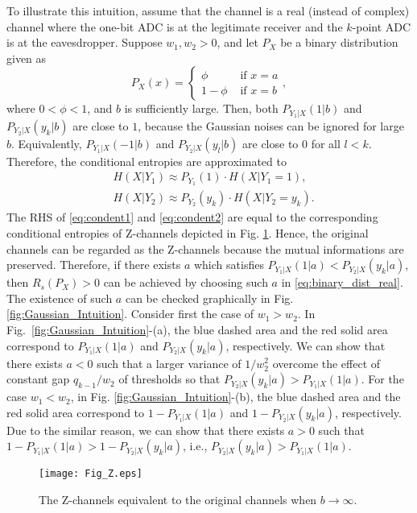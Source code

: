 \documentclass[journal]{IEEEtran}
\begin{document}
To illustrate this intuition, assume that the channel is a real (instead of complex) channel where the one-bit ADC is at the legitimate receiver and the $k$-point ADC is at the eavesdropper. Suppose $w_1,w_2>0$, and let $P_X$ be a binary distribution given as 
\begin{equation}
    P_X(x) = \begin{cases} \phi & \text{ if } x=a \\ 1-\phi & \text{ if } x=b \end{cases}, \label{eq:binary_dist_real}
\end{equation}
where $0<\phi<1$, and $b$ is sufficiently large.
Then, both $P_{Y_1|X}(1|b)$ and $P_{Y_2|X}(y_k|b)$ are close to $1$, because the Gaussian noises can be ignored for large $b$.
Equivalently, $P_{Y_1|X}(-1|b)$ and $P_{Y_2|X}(y_l|b)$ are close to $0$ for all $l<k$.
Therefore, the conditional entropies are approximated to 
\begin{align}
    & H(X|Y_1) \approx P_{Y_1}(1)\cdot H(X|Y_1=1), \label{eq:condent1}
    \\& H(X|Y_2) \approx P_{Y_2}(y_k)\cdot H(X|Y_2=y_k). \label{eq:condent2}
\end{align}
The RHS of \eqref{eq:condent1} and \eqref{eq:condent2} are equal to the corresponding conditional entropies of Z-channels depicted in Fig. \ref{fig:zchannel}. Hence, the original channels can be regarded as the Z-channels because the mutual informations are preserved. Therefore, if there exists $a$ which satisfies $P_{Y_1|X}(1|a) < P_{Y_2|X}(y_k|a)$, then $R_s(P_X)>0$ can be achieved by choosing such $a$ in \eqref{eq:binary_dist_real}. 
The existence of such $a$ can be checked graphically in Fig. \ref{fig:Gaussian_Intuition}. 
Consider first the case of $w_1>w_2$. In \mbox{Fig. \ref{fig:Gaussian_Intuition}-(a)}, the blue dashed area and the red solid area correspond to $P_{Y_1|X}(1|a)$ and $P_{Y_2|X}(y_k|a)$, respectively. We can show that there exists $a<0$ such that a larger variance of $1/w_2^2$ overcome the effect of constant gap $q_{k-1}/w_2$ of thresholds so that $P_{Y_2|X}(y_k|a)>P_{Y_1|X}(1|a)$. 
For the case $w_1<w_2$, in Fig. \ref{fig:Gaussian_Intuition}-(b),  the blue dashed area and the red solid area correspond to $1-P_{Y_1|X}(1|a)$ and $1-P_{Y_2|X}(y_k|a)$, respectively. Due to the similar reason, we can show that there exists $a>0$ such that  $1-P_{Y_1|X}(1|a)>1-P_{Y_2|X}(y_k|a)$, i.e., $P_{Y_2|X}(y_k|a)>P_{Y_1|X}(1|a)$. 


\begin{figure}[t]
    \centering
    \texttt{[image: Fig\_Z.eps]}
    \caption{The Z-channels equivalent to the original channels when $b \rightarrow \infty$.}
    \label{fig:zchannel}
\end{figure}
\end{document}

